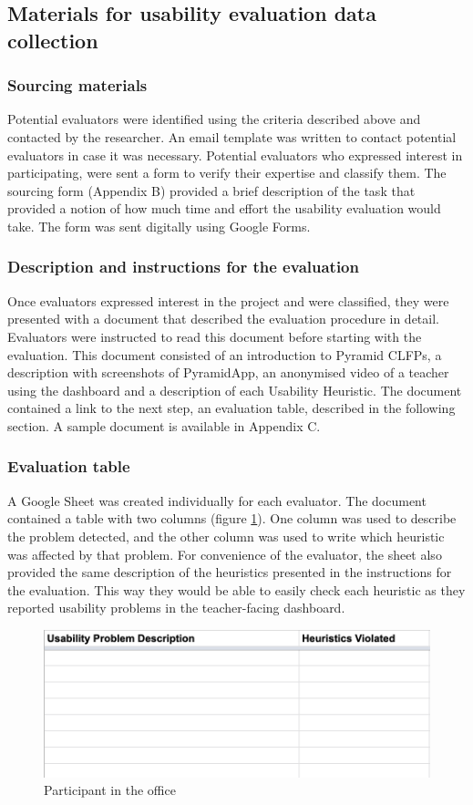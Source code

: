\subsection{Materials for usability evaluation data collection}
\subsubsection{Sourcing materials}
Potential evaluators were identified using the criteria described above and contacted by the researcher. An email template was written to contact potential evaluators in case it was necessary. Potential evaluators who expressed interest in participating, were sent a form to verify their expertise and classify them.
The sourcing form (Appendix B) provided a brief description of the task that provided a notion of how much time and effort the usability evaluation would take. The form was sent digitally using Google Forms.
\subsubsection{Description and instructions for the evaluation}
Once evaluators expressed interest in the project and were classified, they were presented with a document that described the evaluation procedure in detail. Evaluators were instructed to read this document before starting with the evaluation. This document consisted of an introduction to Pyramid CLFPs, a description with screenshots of PyramidApp, an anonymised video of a teacher using the dashboard and a description of each Usability Heuristic. The document contained a link to the next step, an evaluation table, described in the following section. A sample document is available in Appendix C.
\subsubsection{Evaluation table}
A Google Sheet was created individually for each evaluator. The document contained a table with two columns (figure \ref{fig:table}). One column was used  to describe the problem detected, and the other column was used to write which heuristic was affected by that problem. For convenience of the evaluator, the sheet also provided the same description of the heuristics presented in the instructions for the evaluation. This way they would be able to easily check each heuristic as they reported usability problems in the teacher-facing dashboard.
\begin{figure}[!h]
    \includegraphics[clip,width=\columnwidth]{Figures/evaluation_table.png} 
\caption{Participant in the office}
\label{fig:table}
\end{figure}

